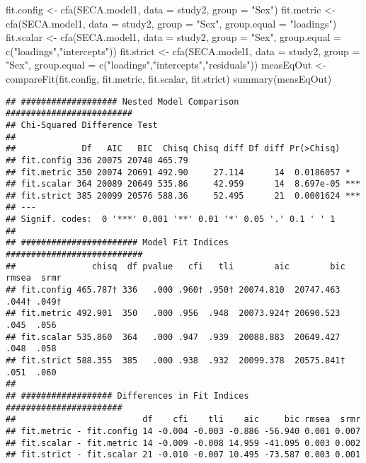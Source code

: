 \documentclass[
]{article}
\newenvironment{Shaded}{\begin{snugshade}}{\end{snugshade}}
\newcommand{\AttributeTok}[1]{\textcolor[rgb]{0.77,0.63,0.00}{#1}}
\newcommand{\FunctionTok}[1]{\textcolor[rgb]{0.00,0.00,0.00}{#1}}
\newcommand{\NormalTok}[1]{#1}
\newcommand{\OtherTok}[1]{\textcolor[rgb]{0.56,0.35,0.01}{#1}}
\newcommand{\StringTok}[1]{\textcolor[rgb]{0.31,0.60,0.02}{#1}}
\begin{document}
\begin{Shaded}
\begin{Highlighting}[]
\NormalTok{fit.config }\OtherTok{\textless{}{-}} \FunctionTok{cfa}\NormalTok{(SECA.model1, }\AttributeTok{data =}\NormalTok{ study2, }\AttributeTok{group =} \StringTok{"Sex"}\NormalTok{)}
\NormalTok{fit.metric }\OtherTok{\textless{}{-}} \FunctionTok{cfa}\NormalTok{(SECA.model1, }\AttributeTok{data =}\NormalTok{ study2, }\AttributeTok{group =} \StringTok{"Sex"}\NormalTok{,}
                  \AttributeTok{group.equal =} \StringTok{"loadings"}\NormalTok{)}
\NormalTok{fit.scalar }\OtherTok{\textless{}{-}} \FunctionTok{cfa}\NormalTok{(SECA.model1, }\AttributeTok{data =}\NormalTok{ study2, }\AttributeTok{group =} \StringTok{"Sex"}\NormalTok{,}
                  \AttributeTok{group.equal =} \FunctionTok{c}\NormalTok{(}\StringTok{"loadings"}\NormalTok{,}\StringTok{"intercepts"}\NormalTok{))}
\NormalTok{fit.strict }\OtherTok{\textless{}{-}} \FunctionTok{cfa}\NormalTok{(SECA.model1, }\AttributeTok{data =}\NormalTok{ study2, }\AttributeTok{group =} \StringTok{"Sex"}\NormalTok{,}
                  \AttributeTok{group.equal =} \FunctionTok{c}\NormalTok{(}\StringTok{"loadings"}\NormalTok{,}\StringTok{"intercepts"}\NormalTok{,}\StringTok{"residuals"}\NormalTok{))}
\NormalTok{measEqOut }\OtherTok{\textless{}{-}} \FunctionTok{compareFit}\NormalTok{(fit.config, fit.metric, fit.scalar, fit.strict)}
\FunctionTok{summary}\NormalTok{(measEqOut)}
\end{Highlighting}
\end{Shaded}

\begin{verbatim}
## ################### Nested Model Comparison #########################
## Chi-Squared Difference Test
## 
##             Df   AIC   BIC  Chisq Chisq diff Df diff Pr(>Chisq)    
## fit.config 336 20075 20748 465.79                                  
## fit.metric 350 20074 20691 492.90     27.114      14  0.0186057 *  
## fit.scalar 364 20089 20649 535.86     42.959      14  8.697e-05 ***
## fit.strict 385 20099 20576 588.36     52.495      21  0.0001624 ***
## ---
## Signif. codes:  0 '***' 0.001 '**' 0.01 '*' 0.05 '.' 0.1 ' ' 1
## 
## ####################### Model Fit Indices ###########################
##               chisq  df pvalue   cfi   tli        aic        bic rmsea  srmr
## fit.config 465.787† 336   .000 .960† .950† 20074.810  20747.463  .044† .049†
## fit.metric 492.901  350   .000 .956  .948  20073.924† 20690.523  .045  .056 
## fit.scalar 535.860  364   .000 .947  .939  20088.883  20649.427  .048  .058 
## fit.strict 588.355  385   .000 .938  .932  20099.378  20575.841† .051  .060 
## 
## ################## Differences in Fit Indices #######################
##                         df    cfi    tli    aic     bic rmsea  srmr
## fit.metric - fit.config 14 -0.004 -0.003 -0.886 -56.940 0.001 0.007
## fit.scalar - fit.metric 14 -0.009 -0.008 14.959 -41.095 0.003 0.002
## fit.strict - fit.scalar 21 -0.010 -0.007 10.495 -73.587 0.003 0.001
\end{verbatim}
\end{document}

